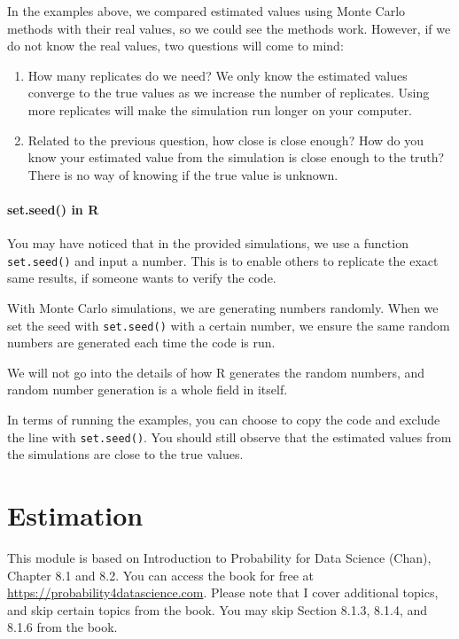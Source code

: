 \documentclass[
]{book}
\begin{document}
In the examples above, we compared estimated values using Monte Carlo methods with their real values, so we could see the methods work. However, if we do not know the real values, two questions will come to mind:

\begin{enumerate}
\def\labelenumi{\arabic{enumi}.}
\item
  How many replicates do we need? We only know the estimated values converge to the true values as we increase the number of replicates. Using more replicates will make the simulation run longer on your computer.
\item
  Related to the previous question, how close is close enough? How do you know your estimated value from the simulation is close enough to the truth? There is no way of knowing if the true value is unknown.
\end{enumerate}

\hypertarget{set.seed-in-r}{%
\subsubsection{set.seed() in R}\label{set.seed-in-r}}

You may have noticed that in the provided simulations, we use a function \texttt{set.seed()} and input a number. This is to enable others to replicate the exact same results, if someone wants to verify the code.

With Monte Carlo simulations, we are generating numbers randomly. When we set the seed with \texttt{set.seed()} with a certain number, we ensure the same random numbers are generated each time the code is run.

We will not go into the details of how R generates the random numbers, and random number generation is a whole field in itself.

In terms of running the examples, you can choose to copy the code and exclude the line with \texttt{set.seed()}. You should still observe that the estimated values from the simulations are close to the true values.

\hypertarget{est}{%
\chapter{Estimation}\label{est}}

This module is based on Introduction to Probability for Data Science (Chan), Chapter 8.1 and 8.2. You can access the book for free at \url{https://probability4datascience.com}. Please note that I cover additional topics, and skip certain topics from the book. You may skip Section 8.1.3, 8.1.4, and 8.1.6 from the book.
\end{document}
